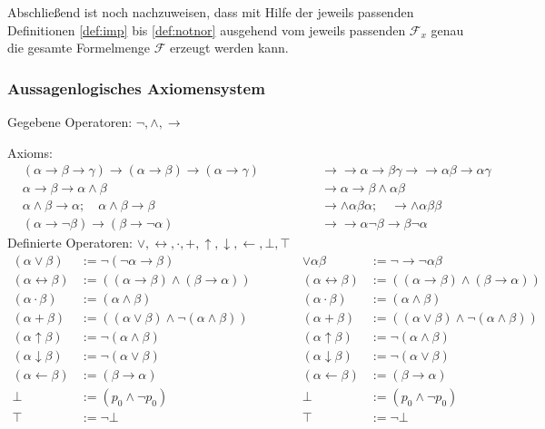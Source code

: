 \documentclass[english,ngerman,parskip=half,headsepline,footsepline,
	fleqn,notitlepage]{scrreprt}
\newcommand*{\defeq}{:=}%
\newcommand*{\ladd}{+}
\newcommand*{\lmult}{\cdot}
\newcommand*{\ltrue}{\top}%
\newcommand*{\lfalse}{\bot}%
\newcommand*{\lrep}{\leftarrow}%
\newcommand*{\limp}{\rightarrow}%
\newcommand*{\lequiv}{\leftrightarrow}%
\newcommand*{\lnand}{\uparrow}%
\newcommand*{\lnor}{\downarrow}%
\newcommand*{\asF}{\mathcal{F}}%
\newcommand*{\asFx}{\mathcal{F}_x}%
\newcommand*{\formulatoleft}{&&&&&&&&&&}%
\newcommand*{\formulaspace}{&&&&}%
\newcommand*{\glsIdxPl}[1]{\glspl{#1}\idx{\gls{#1}}}%
\begin{document}
	Abschließend ist noch nachzuweisen, dass mit Hilfe der jeweils passenden Definitionen \ref{def:imp} bis \ref{def:notnor} ausgehend vom jeweils passenden $\asFx$ genau die gesamte Formelmenge $\asF$ erzeugt werden kann.

	\subsubsection{Aussagenlogisches Axiomensystem}%
	\label{subsub:ausAxiome}

	Gegebene Operatoren: $\lnot, \land, \limp$\par
	\glsIdxPl{Axiom}:
	\begin{align}
		&(\alpha\limp\beta\limp\gamma)\limp(\alpha\limp\beta)%
			\limp(\alpha\limp\gamma)
		\formulaspace&&%
		\limp\limp\alpha\limp\beta\gamma\limp\limp\alpha\beta%
			\limp\alpha\gamma\\
		&\alpha\limp\beta\limp\alpha\land\beta
		\formulaspace&&%
		\limp\alpha\limp\beta\land\alpha\beta\\
		&\alpha\land\beta\limp\alpha ;\quad\alpha\land\beta\limp\beta
		\formulaspace&&%
		\limp\land\alpha\beta\alpha ;\quad\limp\land\alpha\beta\beta\\
		&(\alpha\limp\lnot\beta)\limp(\beta\limp\lnot\alpha)
		\formulaspace&&%
		\limp\limp\alpha\lnot\beta\limp\beta\lnot\alpha
		\formulatoleft
	\end{align}
	Definierte Operatoren: $\lor, \lequiv, \lmult, \ladd,
		\lnand, \lnor, \lrep, \lfalse, \ltrue$
	\begin{align}
		(\alpha\lor\beta)&\defeq\lnot(\lnot\alpha\limp\beta)
		\formulaspace&%
		\lor\alpha\beta&\defeq\lnot\limp\lnot\alpha\beta\\
		(\alpha\lequiv\beta)&\defeq
		((\alpha\limp\beta)\land(\beta\limp\alpha))
		\formulaspace&%
		(\alpha\lequiv\beta)&\defeq((\alpha\limp\beta)%
			\land(\beta\limp\alpha))\\
		(\alpha\lmult\beta)&\defeq(\alpha\land\beta)
		\formulaspace&%
		(\alpha\lmult\beta)&\defeq(\alpha\land\beta)\\
		(\alpha\ladd\beta)&\defeq((\alpha\lor\beta)%
			\land\lnot(\alpha\land\beta))
		\formulaspace&%
		(\alpha\ladd\beta)&\defeq((\alpha\lor\beta)%
			\land\lnot(\alpha\land\beta))\\
		(\alpha\lnand\beta)&\defeq\lnot(\alpha\land\beta)
		\formulaspace&%
		(\alpha\lnand\beta)&\defeq\lnot(\alpha\land\beta)\\
		(\alpha\lnor\beta)&\defeq\lnot(\alpha\lor\beta)
		\formulaspace&%
		(\alpha\lnor\beta)&\defeq\lnot(\alpha\lor\beta)\\
		(\alpha\lrep\beta)&\defeq(\beta\limp\alpha)
		\formulaspace&%
		(\alpha\lrep\beta)&\defeq(\beta\limp\alpha)\\
		\lfalse&\defeq(p_0\land\lnot p_0)
		\formulaspace&%
		\lfalse&\defeq(p_0\land\lnot p_0)\\
		\ltrue&\defeq\lnot\lfalse
		\formulaspace&%
		\ltrue&\defeq\lnot\lfalse
		\formulatoleft
	\end{align}
\end{document}
